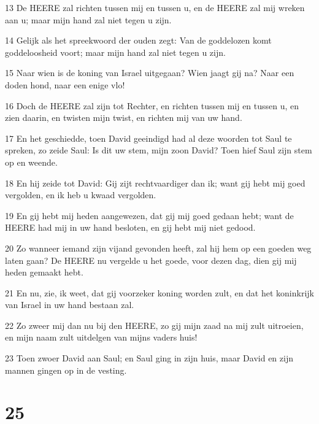 \par 13 De HEERE zal richten tussen mij en tussen u, en de HEERE zal mij wreken aan u; maar mijn hand zal niet tegen u zijn.
\par 14 Gelijk als het spreekwoord der ouden zegt: Van de goddelozen komt goddeloosheid voort; maar mijn hand zal niet tegen u zijn.
\par 15 Naar wien is de koning van Israel uitgegaan? Wien jaagt gij na? Naar een doden hond, naar een enige vlo!
\par 16 Doch de HEERE zal zijn tot Rechter, en richten tussen mij en tussen u, en zien daarin, en twisten mijn twist, en richten mij van uw hand.
\par 17 En het geschiedde, toen David geeindigd had al deze woorden tot Saul te spreken, zo zeide Saul: Is dit uw stem, mijn zoon David? Toen hief Saul zijn stem op en weende.
\par 18 En hij zeide tot David: Gij zijt rechtvaardiger dan ik; want gij hebt mij goed vergolden, en ik heb u kwaad vergolden.
\par 19 En gij hebt mij heden aangewezen, dat gij mij goed gedaan hebt; want de HEERE had mij in uw hand besloten, en gij hebt mij niet gedood.
\par 20 Zo wanneer iemand zijn vijand gevonden heeft, zal hij hem op een goeden weg laten gaan? De HEERE nu vergelde u het goede, voor dezen dag, dien gij mij heden gemaakt hebt.
\par 21 En nu, zie, ik weet, dat gij voorzeker koning worden zult, en dat het koninkrijk van Israel in uw hand bestaan zal.
\par 22 Zo zweer mij dan nu bij den HEERE, zo gij mijn zaad na mij zult uitroeien, en mijn naam zult uitdelgen van mijns vaders huis!
\par 23 Toen zwoer David aan Saul; en Saul ging in zijn huis, maar David en zijn mannen gingen op in de vesting.

\chapter{25}

